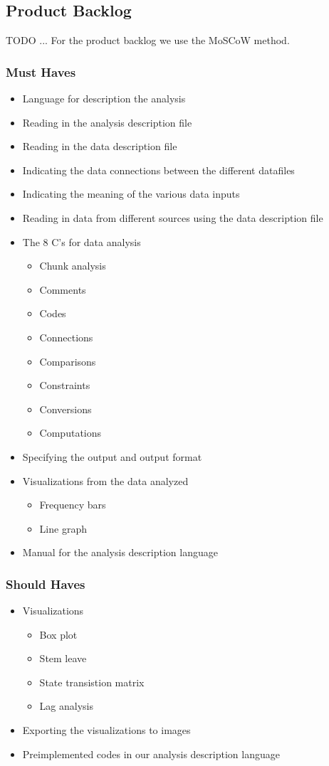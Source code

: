\subsection{Product Backlog}
TODO ... For the product backlog we use the MoSCoW method.
\subsubsection{Must Haves}
\begin{itemize}
  \item Language for description the analysis
  \item Reading in the analysis description file
  \item Reading in the data description file
  \item Indicating the data connections between the different datafiles
  \item Indicating the meaning of the various data inputs
  \item Reading in data from different sources using the data description file
  \item The 8 C's for data analysis
  \begin{itemize}
    \item Chunk analysis
    \item Comments
    \item Codes 
    \item Connections
    \item Comparisons
    \item Constraints
    \item Conversions
    \item Computations
  \end{itemize}
  \item Specifying the output and output format
  \item Visualizations from the data analyzed
  \begin{itemize}
  	\item Frequency bars
    \item Line graph
  \end{itemize}
  \item Manual for the analysis description language
\end{itemize}

\subsubsection{Should Haves}
\begin{itemize}
	\item Visualizations
    \begin{itemize}
    	\item Box plot
        \item Stem leave
        \item State transistion matrix
        \item Lag analysis
    \end{itemize}
	\item Exporting the visualizations to images
    \item Preimplemented codes in our analysis description language
\end{itemize}

